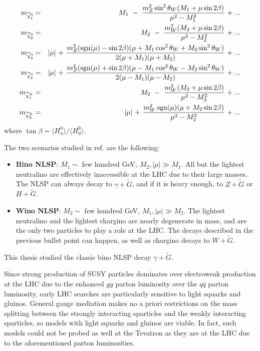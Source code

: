 \documentclass[dissertation.tex]{subfiles}
\begin{document}
\begin{eqnarray}
\label{eq:neutralino_chargino_masses}
m_{\widetilde{\chi}_{1}^{0}} &=& M_{1}\mbox{ }-\mbox{ }\frac{m_{Z}^{2}\sin^{2}\theta_{W}(M_{1} + \mu\sin 2\beta)}{\mu^{2} - M_{1}^{2}}\mbox{ + }...\\
m_{\widetilde{\chi}_{2}^{0}} &=& M_{2}\mbox{ }-\mbox{ }\frac{m_{W}^{2}(M_{2} + \mu\sin 2\beta)}{\mu^{2} - M_{2}^{2}}\mbox{ + }...\\
m_{\widetilde{\chi}_{3}^{0}} &=& |\mu|\mbox{ + }\frac{m_{Z}^{2}(\operatorname{sgn}(\mu) - \sin 2\beta)(\mu + M_{1}\cos^{2}\theta_{W} + M_{2}\sin^{2}\theta_{W})}{2(\mu + M_{1})(\mu + M_{2})}\mbox{ + }...\\
m_{\widetilde{\chi}_{4}^{0}} &=& |\mu|\mbox{ + }\frac{m_{Z}^{2}(\operatorname{sgn}(\mu) + \sin 2\beta)(\mu - M_{1}\cos^{2}\theta_{W} - M_{2}\sin^{2}\theta_{W})}{2(\mu - M_{1})(\mu - M_{2})}\mbox{ + }...\\
m_{\widetilde{\chi}_{1}^{\pm}} &=& M_{2}\mbox{ }-\mbox{ }\frac{m_{W}^{2}(M_{2} + \mu\sin 2\beta)}{\mu^{2} - M_{2}^{2}}\mbox{ + }...\\
m_{\widetilde{\chi}_{2}^{\pm}} &=& |\mu|\mbox{ + }\frac{m_{W}^{2}\operatorname{sgn}(\mu)(\mu + M_{2}\sin 2\beta)}{\mu^{2} - M_{2}^{2}}\mbox{ + }...
\end{eqnarray}
%
where $\tan\beta = \langle H_{u}^{0}\rangle/\langle H_{d}^{0}\rangle$.

The two scenarios studied in ref. \cite{CMS_GMSB_1fb-1} are the following:

\begin{itemize}
  \item \textbf{Bino NLSP}: $M_{1} \sim$ few hundred GeV, $M_{2}, |\mu| \gg M_{1}$.  All but the lightest neutralino are effectively inaccessible at the LHC due to their large masses.  The NLSP can always decay to $\gamma + \widetilde{G}$, and if it is heavy enough, to $Z + \widetilde{G}$ or $H + \widetilde{G}$.
  \item \textbf{Wino NLSP}: $M_{2} \sim$ few hundred GeV, $M_{1}, |\mu| \gg M_{2}$.  The lightest neutralino and the lightest chargino are nearly degenerate in mass, and are the only two particles to play a role at the LHC.  The decays described in the previous bullet point can happen, as well as chargino decays to $W + \widetilde{G}$.
\end{itemize}
%
This thesis studied the classic bino NLSP decay $\gamma + \widetilde{G}$.

Since strong production of SUSY particles dominates over electroweak production at the LHC due to the enhanced $gg$ parton luminosity over the $q\overline{q}$ parton luminosity, early LHC searches are particularly sensitive to light squarks and gluinos.  General gauge mediation makes no a priori restrictions on the mass splitting between the strongly interacting sparticles and the weakly interacting sparticles, so models with light squarks and gluinos are viable.  In fact, such models could not be probed as well at the Tevatron as they are at the LHC due to the aforementioned parton luminosities.
\end{document}
